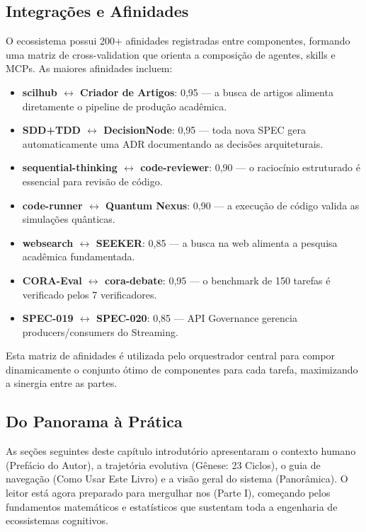 \subsection{Integrações e Afinidades}

O ecossistema possui 200+ afinidades registradas entre componentes,
formando uma matriz de cross-validation que orienta a composição de
agentes, skills e MCPs. As maiores afinidades incluem:

\begin{itemize}
  \item \textbf{scilhub $\leftrightarrow$ Criador de Artigos}: 0,95 --- a
        busca de artigos alimenta diretamente o pipeline de produção
        acadêmica.
  \item \textbf{SDD+TDD $\leftrightarrow$ DecisionNode}: 0,95 --- toda nova
        SPEC gera automaticamente uma ADR documentando as decisões
        arquiteturais.
  \item \textbf{sequential-thinking $\leftrightarrow$ code-reviewer}: 0,90
        --- o raciocínio estruturado é essencial para revisão de código.
  \item \textbf{code-runner $\leftrightarrow$ Quantum Nexus}: 0,90 --- a
        execução de código valida as simulações quânticas.
  \item \textbf{websearch $\leftrightarrow$ SEEKER}: 0,85 --- a busca na
        web alimenta a pesquisa acadêmica fundamentada.
  \item \textbf{CORA-Eval $\leftrightarrow$ cora-debate}: 0,95 --- o
        benchmark de 150 tarefas é verificado pelos 7 verificadores.
  \item \textbf{SPEC-019 $\leftrightarrow$ SPEC-020}: 0,85 --- API
        Governance gerencia producers/consumers do Streaming.
\end{itemize}

Esta matriz de afinidades é utilizada pelo orquestrador central para
compor dinamicamente o conjunto ótimo de componentes para cada tarefa,
maximizando a sinergia entre as partes.

\subsection{Do Panorama à Prática}

As seções seguintes deste capítulo introdutório apresentaram o contexto
humano (Prefácio do Autor), a trajetória evolutiva (Gênese: 23 Ciclos), o
guia de navegação (Como Usar Este Livro) e a visão geral do sistema
(Panorâmica). O leitor está agora preparado para mergulhar nos
 (Parte I), começando
pelos fundamentos matemáticos e estatísticos que sustentam toda a
engenharia de ecossistemas cognitivos.

